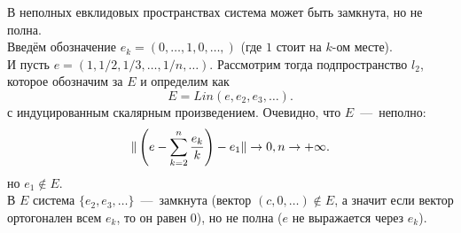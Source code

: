 \begin{note}
    В неполных евклидовых пространствах система может быть замкнута, но не полна. \\
    Введём обозначение $e_k = (0, \ldots, 1, 0, \ldots,)$ (где $1$ стоит на $k$-ом месте). \\
    И пусть $e = (1, 1/2, 1/3, \ldots, 1/n, \ldots)$.
    Рассмотрим тогда подпространство $l_2$, которое обозначим за $E$ и определим как
    \[
        E = Lin(e, e_2, e_3, \ldots).
    \]
    с индуцированным скалярным произведением.
    Очевидно, что $E$~---~неполно:
    \[
        \|\left(e - \sum\limits_{k = 2}^n \dfrac{e_k}{k}\right) - e_1\| \rightarrow 0, n \rightarrow +\infty.
    \]
    но $e_1 \notin E$. \\
    В $E$ система $\{e_2, e_3, \ldots\}$~---~замкнута (вектор $(c, 0, \ldots) \notin E$, а значит если вектор ортогонален всем $e_k$, то он равен 0), но не полна ($e$ не выражается через $e_k$).
\end{note}

